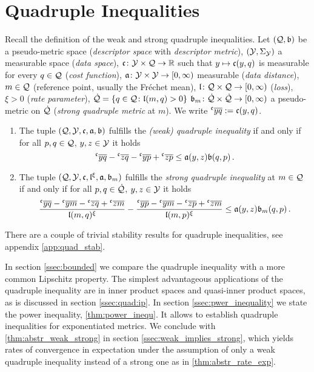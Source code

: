 \section{Quadruple Inequalities}\label{sec:quadruple}
%
Recall the definition of the weak and strong quadruple inequalities.
Let $(\mathcal{Q}, \mathfrak{b})$ be a pseudo-metric space (\textit{descriptor space} with \textit{descriptor metric}), 
$(\mathcal{Y}, \Sigma_{\mathcal{Y}})$ a measurable space (\textit{data space}), 
$\mathfrak{c} \colon \mathcal{Y} \times \mathcal{Q} \to \mathbb{R}$ such that $y\mapsto \mathfrak{c}(y,q)$ is measurable for every $q\in\mathcal{Q}$ (\textit{cost function}),
$\mathfrak{a} \colon \mathcal{Y} \times \mathcal{Y} \to [0,\infty)$ measurable (\textit{data distance}),
$m \in \mathcal{Q}$ (reference point, usually the Fréchet mean),
$\mathfrak{l}\colon \mathcal{Q} \times \mathcal{Q} \to [0,\infty)$ (\textit{loss}),
$\xi > 0$ (\textit{rate parameter}),
$\dot{\mathcal{Q}} = \left\lbrace q\in\mathcal{Q}\colon \mathfrak{l}(m, q) > 0 \right\rbrace$
$\mathfrak{b}_m \colon \dot{\mathcal{Q}} \times \dot{\mathcal{Q}} \to [0,\infty)$ a pseudo-metric on $\dot{\mathcal{Q}}$ (\textit{strong quadruple metric} at $m$).
We write $\olc yq :=\mf c(y,q)$.
%
\begin{enumerate}[label=(\alph*)]
\item 
The tuple $(\mathcal{Q}, \mathcal{Y}, \mathfrak{c}, \mathfrak{a}, \mathfrak{b})$ fulfills the \emph{(weak) quadruple inequality}
	if and only if
	for all $p,q\in\mathcal{Q}$, $y,z\in\mathcal{Y}$ it holds
	\begin{equation*}
		\olc yq- \olc zq -\olc yp+\olc zp \leq \mf a(y,z) \mf b(q,p)
		\eqfs
	\end{equation*}
\item	
	The tuple $(\mathcal{Q}, \mathcal{Y}, \mathfrak{c}, \mathfrak{l}^\xi, \mathfrak{a}, \mathfrak{b}_m)$ fulfills the \emph{strong quadruple inequality} at $m\in\mathcal{Q}$ 
	if and only if
	for all $p,q\in\dot{\mathcal{Q}}$, $y,z\in\mathcal{Y}$ it holds
	\begin{equation*}
		\frac{\olc yq- \olc ym- \olc zq + \olc zm}{\mf l(m,q)^\xi} - \frac{\olc yp- \olc ym- \olc zp + \olc zm}{\mf l(m,p)^\xi} \leq \mf a(y,z) \mf b_m(q,p)
		\eqfs
	\end{equation*}
\end{enumerate}
%
There are a couple of trivial stability results for quadruple inequalities, see appendix \autoref{app:quad_stab}.

In section \ref{ssec:bounded} we compare the quadruple inequality with a more common Lipschitz property. The simplest advantageous applications of the quadruple inequality are in inner product spaces and quasi-inner product spaces, as is discussed in section \ref{ssec:quad:ip}. In section \ref{ssec:pwer_inequality} we state the power inequality, \autoref{thm:power_inequ}. It allows to establish quadruple inequalities for exponentiated metrics. We conclude with \autoref{thm:abstr_weak_strong} in section \ref{ssec:weak_implies_strong}, which yields rates of convergence in expectation under the assumption of only a weak quadruple inequality instead of a strong one as in \autoref{thm:abstr_rate_exp}.
%
%
